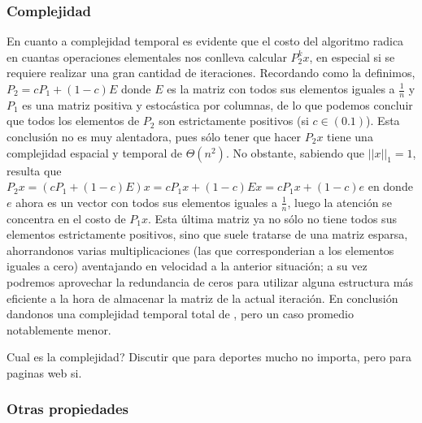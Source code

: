 \iffalse
La idea básicamente es generar la secuencia $x_k = Px_{k-1}$ y tomar $k\to\infty$. Se puede probar que para este caso no importa el valor inicial que asignemos a la secuencia $x_0$, el vector converge al autovector asociado al mayor autovalor de P. Se puede probar que todo autovalor $\lambda$ de $P$ satisface que $|\lambda| < 1$.

Otra propiedad interesante es que el método de la potencia va a converger de forma asintotica siguiendo $\norm{Px_k - q}_1 \approx |\lambda_2| \norm{x-q}_1$ donde $\lambda_2$ es el segundo autovalor mas grande de P. \textbf{Mauro revisa esto y fijate si sirve y se puede hacer algún criterio de parada copado.}
\fi

\subsubsection{Complejidad}

En cuanto a complejidad temporal es evidente que el costo del algoritmo radica en cuantas operaciones elementales nos conlleva calcular $P_2^kx$, en especial si se requiere realizar una gran cantidad de iteraciones. Recordando como la definimos, $P_2 = cP_1 + (1-c)E$ donde $E$ es la matriz con todos sus elementos iguales a $\frac{1}{n}$ y $P_1$ es una matriz positiva y estocástica por columnas, de lo que podemos concluir que todos los elementos de $P_2$ son estrictamente positivos (si $c\in(0.1)$). Esta conclusión no es muy alentadora, pues sólo tener que hacer $P_2x$ tiene una complejidad espacial y temporal de $\Theta(n^2)$. No obstante, sabiendo que $||x||_1=1$, resulta que $P_2x = (cP_1 + (1-c)E)x = cP_1x + (1-c)Ex = cP_1x + (1-c)e$ en donde $e$ ahora es un vector con todos sus elementos iguales a $\frac{1}{n}$, luego la atención se concentra en el costo de $P_1x$. Esta última matriz ya no sólo no tiene todos sus elementos estrictamente positivos, sino que suele tratarse de una matriz esparsa, ahorrandonos varias multiplicaciones (las que corresponderian a los elementos iguales a cero) aventajando en velocidad a la anterior situación; a su vez podremos aprovechar la redundancia de ceros para utilizar alguna estructura más eficiente a la hora de almacenar la matriz de la actual iteración. En conclusión dandonos una complejidad temporal total de , pero un caso promedio notablemente menor.

\iffalse
Cual es la complejidad? Discutir que para deportes mucho no importa, pero para paginas web si.

\subsubsection{Otras propiedades}

